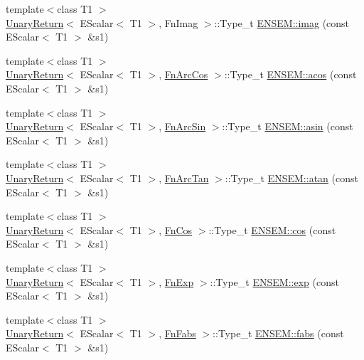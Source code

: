 \begin{DoxyCompactItemize}
{\footnotesize template$<$class T1 $>$ }\\\mbox{\hyperlink{structUnaryReturn}{Unary\+Return}}$<$ E\+Scalar$<$ T1 $>$, Fn\+Imag $>$\+::Type\+\_\+t \mbox{\hyperlink{group__escalar_ga415448f22c6dabfd82cbb0154e054c2e}{E\+N\+S\+E\+M\+::imag}} (const E\+Scalar$<$ T1 $>$ \&s1)
\item 
{\footnotesize template$<$class T1 $>$ }\\\mbox{\hyperlink{structUnaryReturn}{Unary\+Return}}$<$ E\+Scalar$<$ T1 $>$, \mbox{\hyperlink{structFnArcCos}{Fn\+Arc\+Cos}} $>$\+::Type\+\_\+t \mbox{\hyperlink{group__escalar_gac8e90d16773622bd9971db55f0c125c9}{E\+N\+S\+E\+M\+::acos}} (const E\+Scalar$<$ T1 $>$ \&s1)
\item 
{\footnotesize template$<$class T1 $>$ }\\\mbox{\hyperlink{structUnaryReturn}{Unary\+Return}}$<$ E\+Scalar$<$ T1 $>$, \mbox{\hyperlink{structFnArcSin}{Fn\+Arc\+Sin}} $>$\+::Type\+\_\+t \mbox{\hyperlink{group__escalar_gab463bdb3f1fadf6b5a87076e5d3dc9b9}{E\+N\+S\+E\+M\+::asin}} (const E\+Scalar$<$ T1 $>$ \&s1)
\item 
{\footnotesize template$<$class T1 $>$ }\\\mbox{\hyperlink{structUnaryReturn}{Unary\+Return}}$<$ E\+Scalar$<$ T1 $>$, \mbox{\hyperlink{structFnArcTan}{Fn\+Arc\+Tan}} $>$\+::Type\+\_\+t \mbox{\hyperlink{group__escalar_ga3169598490417ab5713660967ec6b658}{E\+N\+S\+E\+M\+::atan}} (const E\+Scalar$<$ T1 $>$ \&s1)
\item 
{\footnotesize template$<$class T1 $>$ }\\\mbox{\hyperlink{structUnaryReturn}{Unary\+Return}}$<$ E\+Scalar$<$ T1 $>$, \mbox{\hyperlink{structFnCos}{Fn\+Cos}} $>$\+::Type\+\_\+t \mbox{\hyperlink{group__escalar_ga841db2f3f6d6a553733b1b75a638f052}{E\+N\+S\+E\+M\+::cos}} (const E\+Scalar$<$ T1 $>$ \&s1)
\item 
{\footnotesize template$<$class T1 $>$ }\\\mbox{\hyperlink{structUnaryReturn}{Unary\+Return}}$<$ E\+Scalar$<$ T1 $>$, \mbox{\hyperlink{structFnExp}{Fn\+Exp}} $>$\+::Type\+\_\+t \mbox{\hyperlink{group__escalar_ga80b6028648c4f7d8f84f04d129bfa976}{E\+N\+S\+E\+M\+::exp}} (const E\+Scalar$<$ T1 $>$ \&s1)
\item 
{\footnotesize template$<$class T1 $>$ }\\\mbox{\hyperlink{structUnaryReturn}{Unary\+Return}}$<$ E\+Scalar$<$ T1 $>$, \mbox{\hyperlink{structFnFabs}{Fn\+Fabs}} $>$\+::Type\+\_\+t \mbox{\hyperlink{group__escalar_ga60eef052054b1a7da3e16a844de7d565}{E\+N\+S\+E\+M\+::fabs}} (const E\+Scalar$<$ T1 $>$ \&s1)

\end{DoxyCompactItemize}

